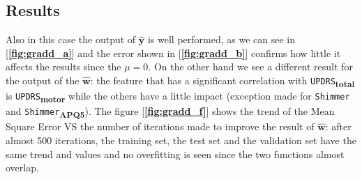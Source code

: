 \documentclass[12pt]{report}
\begin{document}
\subsection{Results}
Also in this case the output of $\hat { \mathbf { y } }$ is well performed, as we can see in [\textbf{\ref{fig:gradd_a}}] and the error shown in [\textbf{\ref{fig:gradd_b}}] confirms how little it affects the results since the $\mu = 0$.
On the other hand we see a different result for the output of the $\hat { \mathbf { w } }$: the feature that has a significant correlation with \texttt{UPDRS}\textsubscript{\textbf{total}} is \texttt{UPDRS}\textsubscript{\textbf{motor}} while the others have a little impact (exception made for \texttt{Shimmer} and \texttt{Shimmer}\textsubscript{\textbf{APQ5}}).
The figure [\textbf{\ref{fig:gradd_f}}] shows the trend of the Mean Square Error VS the number of iterations made to improve the result of $\hat { \mathbf { w } }$: after almost 500 iterations, the training set, the test set and the validation set have the same trend and values and no overfitting is seen since the two functions almost overlap.
\end{document}
